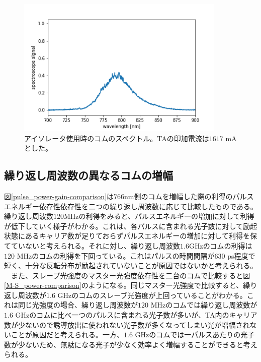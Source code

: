 \documentclass[uplatex, dvipdfmx, a4paper, report, papersize, 11pt]{jsbook}
\begin{document}
\begin{figure}[H]
 \begin{center}
  \includegraphics[width=100mm]{figures/chapter4/comb-spectrum_no-return.png}
\end{center}
 \caption{アイソレータ使用時のコムのスペクトル。TAの印加電流は$1617$ mAとした。}
 \label{spectrum_current_isolator}
\end{figure}
\subsection{繰り返し周波数の異なるコムの増幅}

図\ref{pulse_power-gain-comparison}は766nm側のコムを増幅した際の利得のパルスエネルギー依存性依存性を二つの繰り返し周波数に応じて比較したものである。繰り返し周波数$120 \mathrm{MHz}$の利得をみると、パルスエネルギーの増加に対して利得が低下していく様子がわかる。これは、各パルスに含まれる光子数に対して励起状態にあるキャリア数が足りておらずパルスエネルギーの増加に対して利得を保てていないと考えられる。それに対し、繰り返し周波数$1.6 \mathrm{GHz}$のコムの利得は$120$ MHzのコムの利得を下回っている。これはパルスの時間間隔が$630$ ps程度で短く、十分な反転分布が励起されていないことが原因ではないかと考えられる。\\
　また、スレーブ光強度のマスター光強度依存性を二台のコムで比較すると図\ref{M-S_power-comparison}のようになる。同じマスター光強度で比較すると、繰り返し周波数が$1.6$ GHzのコムのスレーブ光強度が上回っていることがわかる。これは同じ光強度の場合、繰り返し周波数が$120$ MHzのコムでは繰り返し周波数が$1.6$ GHzのコムに比べ一つのパルスに含まれる光子数が多いが、TA内のキャリア数が少ないので誘導放出に使われない光子数が多くなってしまい光が増幅されないことが原因だと考えられる。一方、$1.6$ GHzのコムでは一パルスあたりの光子数が少ないため、無駄になる光子が少なく効率よく増幅することができると考えられる。
\end{document}
